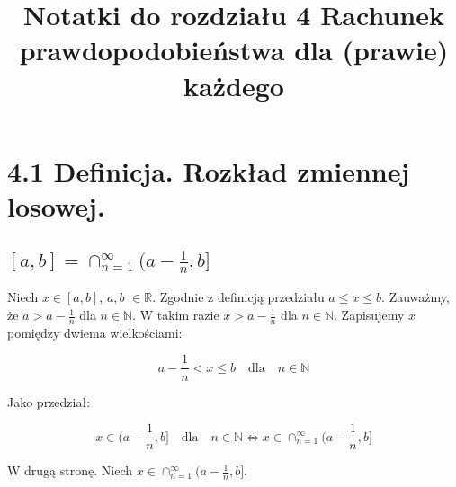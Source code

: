 \documentclass[12pt, letterpaper, twoside]{article}
\title{Notatki do rozdziału 4 Rachunek prawdopodobieństwa dla (prawie) każdego}
\author{}
\date{}
\begin{document}
\begin{titlepage}
\maketitle
\tableofcontents
\end{titlepage}


\section{4.1 Definicja. Rozkład zmiennej losowej.}
\subsection{$[a,b] = \cap_{n=1}^{\infty}(a - \frac{1}{n}, b]$}

Niech $x \in [a,b]$, $a,b$ $\in \mathbb{R}$. Zgodnie z definicją przedziału
$a \leq x \leq b$. Zauważmy, że $a > a - \frac{1}{n}$ dla $n \in \mathbb{N}$. W takim razie
$x > a - \frac{1}{n}$ dla $n \in \mathbb{N}$. Zapisujemy $x$ pomiędzy
dwiema wielkościami:

\begin{equation*}
    a - \frac{1}{n} < x \leq b  \quad \textrm{dla} \quad n \in \mathbb{N}
\end{equation*}

\noindent
Jako przedział:

\begin{equation*}
    x \in (a - \frac{1}{n}, b] \quad \textrm{dla} \quad n \in \mathbb{N} \iff x \in \cap_{n=1}^{\infty}(a - \frac{1}{n}, b]
\end{equation*}

\vspace{10mm}
\noindent
W drugą stronę. Niech $x \in \cap_{n=1}^{\infty}(a - \frac{1}{n}, b]$.
\end{document}
